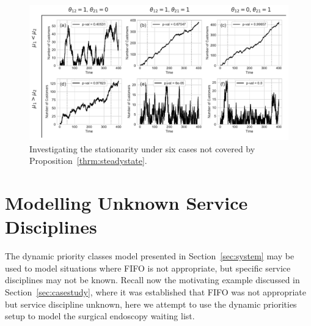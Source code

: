 \documentclass{article}
\begin{document}
\begin{figure}
  \begin{center}
    \includegraphics[width=\textwidth]{img/adf_theorem_gap.pdf}
    \caption{Investigating the stationarity under six cases not covered by
    Proposition~\ref{thrm:steadystate}.}
    \label{fig:adf_gap}
  \end{center}
\end{figure}


\section{Modelling Unknown Service Disciplines}\label{sec:modelling}
The dynamic priority classes model presented in Section~\ref{sec:system} may be
used to model situations where FIFO is not appropriate, but specific service
disciplines may not be known. Recall now the motivating example
discussed in Section~\ref{sec:casestudy}, where it was established that FIFO was
not appropriate but service discipline unknown, here we attempt to use the
dynamic priorities setup to model the surgical endoscopy waiting list.
\end{document}
